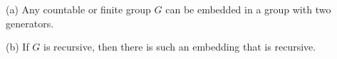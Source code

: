 (a) Any countable or finite group $G$ can be embedded in a group with two generators.

(b) If $G$ is recursive, then there is such an embedding that is recursive.
